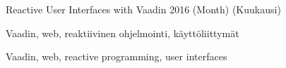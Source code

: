 \usepackage{caption}
\captionsetup[lstlisting]{
    singlelinecheck=off,
    justification=raggedright
}

\usepackage{float}


\makeatletter
\renewcommand{\@chapapp}{\relax}
\renewcommand{\@makechapterhead}[1]{%
  \vspace*{50\p@}%
  {\parindent \z@ \raggedright \normalfont
    \ifnum \c@secnumdepth >\m@ne
     \huge\bfseries \@chapapp\space \thechapter\space\space
    \fi
    \interlinepenalty\@M
    \Huge \bfseries #1\par\nobreak
    \vskip 40\p@
  }}
\makeatother


\newcommand{\ab}[1]{\textsc{#1}}

\newcommand{\num}[1]{#1}

%
%


{}\finfalse

    {Reactive User Interfaces with Vaadin}
    {}
    {}
    {2016}
    {(Month)}
    {(Kuukausi)} 
    


\gentitle

\begin{ittiivis}{Vaadin, web, reaktiivinen ohjelmointi, käyttöliittymät}
    
\end{ittiivis}

\begin{itabstract}{Vaadin, web, reactive programming, user interfaces}
    
\end{itabstract}


